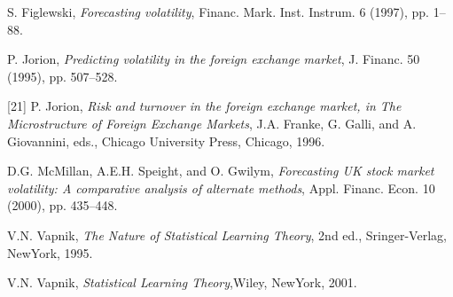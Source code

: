 \begin{thebibliography}{9}
S. Figlewski, \textit{Forecasting volatility}, Financ. Mark. Inst. Instrum. 6 (1997), pp. 1–88.

P. Jorion, \textit{Predicting volatility in the foreign exchange market}, J. Financ. 50 (1995), pp. 507–528.

[21] P. Jorion, \textit{Risk and turnover in the foreign exchange market, in The Microstructure of Foreign Exchange Markets}, J.A. Franke, G. Galli, and A. Giovannini, eds., Chicago University Press, Chicago, 1996.

D.G. McMillan, A.E.H. Speight, and O. Gwilym, \textit{Forecasting UK stock market volatility: A comparative analysis of alternate methods}, Appl. Financ. Econ. 10 (2000), pp. 435–448.

V.N. Vapnik, \textit{The Nature of Statistical Learning Theory}, 2nd ed., Sringer-Verlag, NewYork, 1995.


V.N. Vapnik, \textit{Statistical Learning Theory},Wiley, NewYork, 2001.

\end{thebibliography}